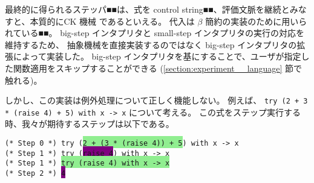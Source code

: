 最終的に得られるステッパ■■は、式を control string■■、評価文脈を継続とみなすと、本質的にCK 機械 \cite{FF1986} であるといえる。
代入は $\beta$ 簡約の実装のために用いられている■■。
big-step インタプリタと small-step インタプリタの実行の対応を維持するため、
抽象機械を直接実装するのではなく big-step インタプリタの拡張によって実装した。
big-step インタプリタを基にすることで、ユーザが指定した関数適用をスキップすることができる
(\ref{section:experiment__language} 節で触れる)。

しかし、この実装は例外処理について正しく機能しない。
例えば、 \texttt{try (2 + 3 * (raise 4) + 5) with x -> x} について考える。
この式をステップ実行する時、我々が期待するステップは以下である。

\vspace{0.2cm}

\noindent \texttt{(* Step 0 *) try (\colorbox{lightgreen}{2 + (3 * (raise 4)) + 5}) with x -> x\\
  (* Step 1 *) try (\colorbox{purple}{raise 4}) with x -> x\\
  (* Step 1 *) \colorbox{lightgreen}{try (raise 4) with x -> x}\\
  (* Step 2 *) \colorbox{purple}{4}\\
}

\vspace{0.2cm}

